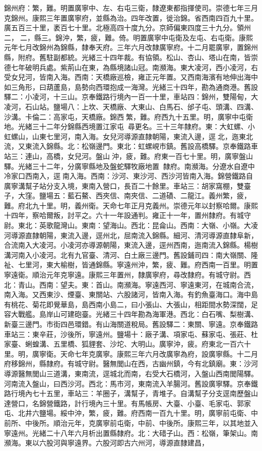 \begin{pinyinscope}
錦州府：繁，難。明置廣寧中、左、右屯三衛，隸遼東都指揮使司。崇德七年三月克錦州。康熙三年置廣寧府，並縣為治。四年改置，徙治錦。省西南四百九十里。廣五百三十里，袤百七十里。北極高四十度九分。京師偏東四度三十九分。領州二，二，縣三。錦沖，繁，疲，難。倚。明置廣寧中屯衛及左屯、右屯衛。康熙元年七月改錦州為錦縣，隸奉天府。三年六月改隸廣寧府。十二月罷廣寧，置錦州縣，附府。舊駐副都統。光緒三十四年裁。有協領。松山、杏山、塔山在南，皆崇德七年破明兵處。紫荊山在東，為縣境諸山冠。南瀕海。東大凌河，西小凌河，右受女兒河，皆南入海。西南：天橋廠巡檢，雍正元年置。又西南海濱有地伸出海中如三角形，曰葫蘆島，島勢向西環抱成一海灣。光緒三十四年，勘為通商港。舊設驛二：小凌河，十三山。京奉鐵路行境內一百一十里，車站四：錦州，雙陽甸，大凌河，石山站。鹽場八：上坎、天橋廠、大東山、白馬石、邰子屯、頭溝、四溝、沙溝。卡倫二：高家屯，天橋廠。錦西繁，難。府西九十五里。明，廣寧中屯衛地。光緒三十二年分錦縣西境置江家屯，尋更名。三十三年隸府。東：大虹螺、小虹螺山，山東七里河，南入海。女兒河導源直隸朝陽，東流入邊，逕北，迤東北流，又東流入錦縣。北：松嶺邊門。東北：虹螺峴市鎮。舊設高橋驛。京奉鐵路車站三：連山，高橋，女兒河。盤山沖，疲，難。府東一百七十里。明，廣寧盤山驛。光緒三十二年，分廣寧縣地及盤蛇驛牧廠地置，隸府。南瀕海。分遼水自遼中冷家口西南入，逕南入海。西南：沙河、東沙河、西沙河皆南入海。錦營鐵路自廣寧溝幫子站分支入境，東南入營口，長百二十餘里。車站三：胡家窩棚，雙臺子，大窪。鹽場五：藍石鰲、西夾信、南夾信、二道磧、二龍江。義州繁，疲，難。府北九十里。明，義州衛。天命七年正月克義州。崇德元年以封察哈爾。康熙十四年，察哈爾叛，討平之。六十一年設通判。雍正十一年，置州隸府。有城守尉。東北：英歌龍灣山。東南：望海山。西北：昆侖山。西南：大嶺、小嶺。大凌河導源直隸朝陽，東流入邊，逕州北，屈南流入錦縣。細河、清河導源直隸阜新，合流南入大凌河。小凌河亦導源朝陽，東流入邊，逕州西南，迤南流入錦縣。楊樹溝河南入小凌河。北有九官臺、清河、白土廠三邊門。舊設鋪司四：南大嶺關、隆祉、七里河，東大榆樹，皆通錦縣。寧遠州沖，繁，疲、難。府西南一百里。明置寧遠衛。順治元年克寧遠。康熙三年置州，隸廣寧府，尋改隸府。有城守尉。西北：青山。西南：望夫。東：首山。南瀕海。寧遠西河、寧遠東河，在城南合流，南入海。又西東沙、煙臺、東關站、六股諸河，皆南入海。有釣魚臺海口。海中島有桃花、菊花即覺華島，島西南小島二，曰小張山、大張山，相距間水勢深闊，足容大戰艦。島岸山可建砲臺。光緒三十四年勘為海軍港。西北：白石嘴、梨樹溝、新臺三邊門。市街四邑環錯。有山海關道稅局。舊設驛二：東關、寧遠。京奉鐵路車站三：東辛莊，沙後所，寧遠州。鹽場十：廠子溝、項家屯、蘇家屯、張莊、杜家臺、蜊蝗溝、五里橋、狐貍套、沙坨、大明山。廣寧沖，疲。府東北一百六十里。明，廣寧衛。天命七年克廣寧。康熙三年六月改廣寧為府，設廣寧縣。十二月府移錦州，縣隸府。有城守尉。醫無閭山在西，古幽州鎮，今有北鎮廟。東：沙河導源醫無閭山三道溝，東南流，逕城北而南，右受大石橋河，入盤山西南閭陽驛。河南流入盤山，曰西沙河。西北：馬市河，東南流入羊腸河。舊設廣寧驛。京奉鐵路行境內七十五里，車站三：羊圈子，溝幫子，青堆子。自溝幫子分支逕南歷盤山達營口，名錦營鐵路，計行境內三十里。有馬帳房、大臺、小臺、毛家屯、郭家屯、北井六鹽場。綏中沖，繁，疲，難。府西南一百九十里。明，廣寧前屯衛、中前所、中後所。順治元年，克廣寧前屯衛，中前、中後所。康熙三年，以其地並入寧遠州。光緒二十八年六月析出置縣隸府。北：大碏子山。西：松嶺，筆架山。南瀕海。東以六股河與寧遠界。六股河即古六州河，導源直隸建昌，
\end{pinyinscope}
